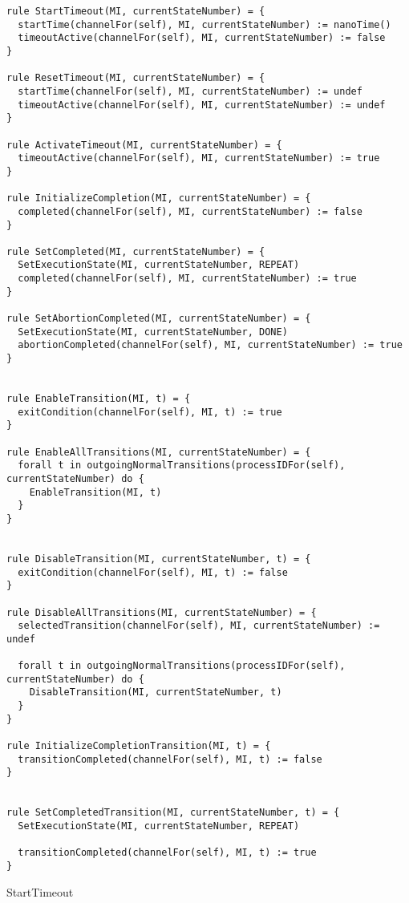 \begin{listing}[H]
\begin{verbatim}
rule StartTimeout(MI, currentStateNumber) = {
  startTime(channelFor(self), MI, currentStateNumber) := nanoTime()
  timeoutActive(channelFor(self), MI, currentStateNumber) := false
}

rule ResetTimeout(MI, currentStateNumber) = {
  startTime(channelFor(self), MI, currentStateNumber) := undef
  timeoutActive(channelFor(self), MI, currentStateNumber) := undef
}

rule ActivateTimeout(MI, currentStateNumber) = {
  timeoutActive(channelFor(self), MI, currentStateNumber) := true
}

rule InitializeCompletion(MI, currentStateNumber) = {
  completed(channelFor(self), MI, currentStateNumber) := false
}

rule SetCompleted(MI, currentStateNumber) = {
  SetExecutionState(MI, currentStateNumber, REPEAT)
  completed(channelFor(self), MI, currentStateNumber) := true
}

rule SetAbortionCompleted(MI, currentStateNumber) = {
  SetExecutionState(MI, currentStateNumber, DONE)
  abortionCompleted(channelFor(self), MI, currentStateNumber) := true
}


rule EnableTransition(MI, t) = {
  exitCondition(channelFor(self), MI, t) := true
}

rule EnableAllTransitions(MI, currentStateNumber) = {
  forall t in outgoingNormalTransitions(processIDFor(self), currentStateNumber) do {
    EnableTransition(MI, t)
  }
}


rule DisableTransition(MI, currentStateNumber, t) = {
  exitCondition(channelFor(self), MI, t) := false
}

rule DisableAllTransitions(MI, currentStateNumber) = {
  selectedTransition(channelFor(self), MI, currentStateNumber) := undef

  forall t in outgoingNormalTransitions(processIDFor(self), currentStateNumber) do {
    DisableTransition(MI, currentStateNumber, t)
  }
}

rule InitializeCompletionTransition(MI, t) = {
  transitionCompleted(channelFor(self), MI, t) := false
}


rule SetCompletedTransition(MI, currentStateNumber, t) = {
  SetExecutionState(MI, currentStateNumber, REPEAT)

  transitionCompleted(channelFor(self), MI, t) := true
}
\end{verbatim}
\caption{StartTimeout}
\label{lst:asm:StartTimeout}
\end{listing}



